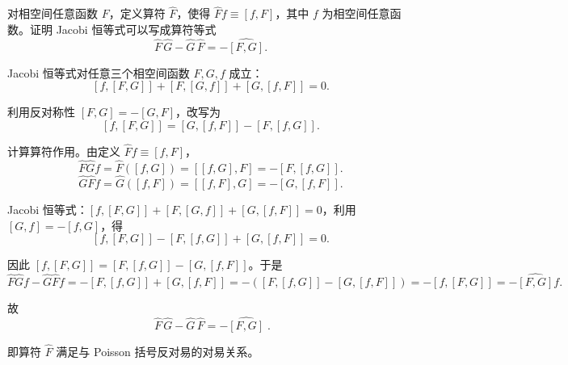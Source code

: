 \begin{question}
对相空间任意函数 \(F\)，定义算符 \(\widehat F\)，使得 \(\widehat F f \equiv [f,F]\)，其中 \(f\) 为相空间任意函数。证明 Jacobi 恒等式可以写成算符等式
\[
\widehat F\,\widehat G - \widehat G\,\widehat F = -\widehat{[F,G]}.
\]
\begin{solution}
Jacobi 恒等式对任意三个相空间函数 \(F,G,f\) 成立：
\[
[f, [F,G]] + [F, [G,f]] + [G, [f,F]] = 0.
\]

利用反对称性 \([F,G] = -[G,F]\)，改写为
\[
[f, [F,G]] = [G, [f,F]] - [F, [f,G]].
\]

计算算符作用。由定义 \(\widehat F f \equiv [f,F]\)，
\[
\widehat F\widehat G f = \widehat F([f,G]) = [[f,G], F] = -[F,[f,G]].
\]
\[
\widehat G\widehat F f = \widehat G([f,F]) = [[f,F], G] = -[G,[f,F]].
\]

Jacobi 恒等式：\([f,[F,G]] + [F,[G,f]] + [G,[f,F]] = 0\)，利用 \([G,f] = -[f,G]\)，得
\[
[f,[F,G]] - [F,[f,G]] + [G,[f,F]] = 0.
\]

因此 \([f,[F,G]] = [F,[f,G]] - [G,[f,F]]\)。于是
\[
\widehat F\widehat G f - \widehat G\widehat F f = -[F,[f,G]] + [G,[f,F]]
= -([F,[f,G]] - [G,[f,F]])
= -[f,[F,G]] = -\widehat{[F,G]} f.
\]

故
\[
\boxed{\;\widehat F\,\widehat G - \widehat G\,\widehat F = -\widehat{[F,G]}\;}.
\]

即算符 \(\widehat F\) 满足与 Poisson 括号反对易的对易关系。
\end{solution}
\end{question}

